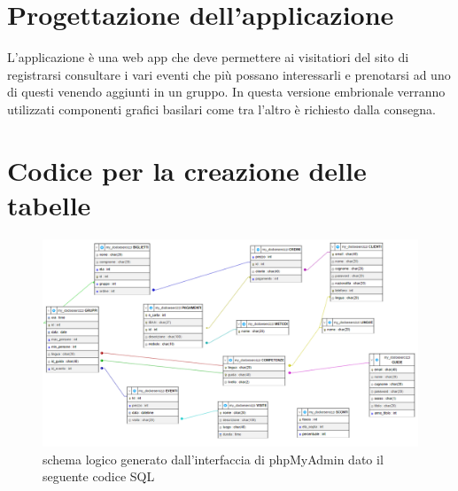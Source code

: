 \documentclass[a4paper,12pt]{report}
\begin{document}
\chapter{Progettazione dell'applicazione}
L'applicazione è una web app che deve permettere ai visitatiori
del sito di registrarsi consultare i vari eventi che più
possano interessarli e prenotarsi ad uno di questi venendo aggiunti
in un gruppo.
In questa versione embrionale verranno utilizzati componenti grafici basilari
come tra l'altro è richiesto dalla consegna.

\appendix
\chapter{Codice per la creazione delle tabelle \label{A:CreateTable}}

\begin{figure}[H]
	\centering
	\includegraphics[height=0.67\textwidth,angle=90]{../resources/img/phpMyadmin.png}
	\caption{schema logico generato dall'interfaccia di phpMyAdmin dato il seguente codice SQL}
\end{figure}
\end{document}
